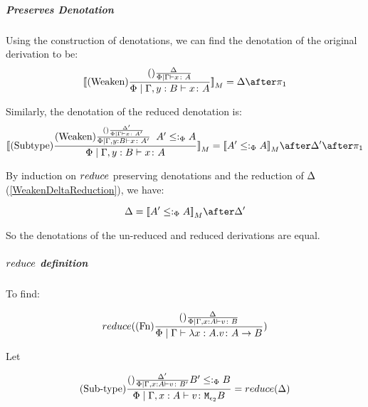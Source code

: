 \documentclass{report}
\begin{document}
            \subparagraph{Preserves Denotation}
            Using the construction of denotations, we can find the denotation of the original derivation to be:
            \begin{equation}
                \deno{\treerule{Weaken}{\treerule{}{\D}{\gpetyperelation{x}{A}}}{\etyperelation{\P}{\gby}{x}{A}}} = \D \after \p
            \end{equation}

            Similarly, the denotation of the reduced denotation is:
            \begin{equation}
                \deno{\treerule{Subtype}{
                    \treerule{Weaken}{
                        \treerule{}{\D'}{\gpetyperelation{x}{A'}}
                    } {
                        \etyperelation{\P}{\gby}{x}{A'}
                    }
                    \s\s
                    A' \subtypep A
                    }{\etyperelation{\P}{\gby}{x}{A}}} = \deno{A'\subtypep A}\after \D' \after \p
            \end{equation}


            By induction on $reduce$ preserving denotations and the reduction of $\Delta$ (\ref{WeakenDeltaReduction}), we have:

            \begin{equation}
                \D = \deno{A' \subtypep A}\after\D'
            \end{equation}

            So the denotations of the un-reduced and reduced derivations are equal.

            \subparagraph{$reduce$ definition}
                To find:
            
                \begin{equation}
                    reduce((\text{Fn}) \frac{
                        (\text{}) \frac{\Delta}{\Phi\mid\Gamma, x: A \vdash v \colon B}
                    }{\Phi\mid\Gamma \vdash \lambda x : A. v \colon A\rightarrow B})
                \end{equation}

                Let 

                \begin{equation}
                    (\text{Sub-type}) \frac{
                        (\text{}) \frac{\Delta'}{\Phi\mid\Gamma, x: A \vdash v \colon B'}
                        B' \leq:_\Phi B
                    }{
                        \Phi\mid\Gamma, x: A \vdash v \colon \texttt{M}_{\epsilon_2}{B}
                    } = reduce(\Delta)
                \end{equation}
\end{document}
